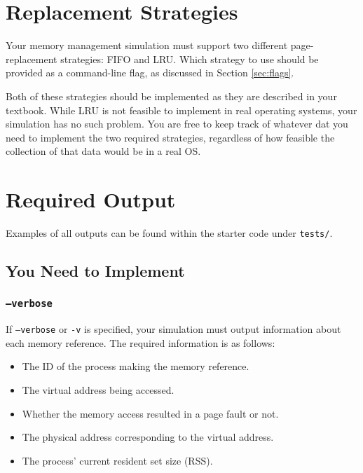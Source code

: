\documentclass[10pt]{article}
\begin{document}

\section{Replacement Strategies}
\label{sec:replacement_strats}

Your memory management simulation must support two different page-replacement strategies: FIFO and LRU. Which strategy to use should be provided as a command-line flag, as discussed in Section \ref{sec:flags}.

Both of these strategies should be implemented as they are described in your textbook. While LRU is not feasible to implement in real operating systems, your simulation has no such problem. You are free to keep track of whatever dat you need to implement the two required strategies, regardless of how feasible the collection of that data would be in a real OS.



\clearpage
\section{Required Output}
\label{sec:output}

Examples of all outputs can be found within the starter code under \texttt{tests/}.

\subsection{You Need to Implement}

\subsubsection{\texttt{--verbose}}

If \texttt{--verbose} or \texttt{-v} is specified, your simulation must output information about each memory reference. The required information is as follows:

\begin{itemize}
    \item The ID of the process making the memory reference.
    \item The virtual address being accessed.
    \item Whether the memory access resulted in a page fault or not.
    \item The physical address corresponding to the virtual address.
    \item The process' current resident set size (RSS).
\end{itemize}
\end{document}
